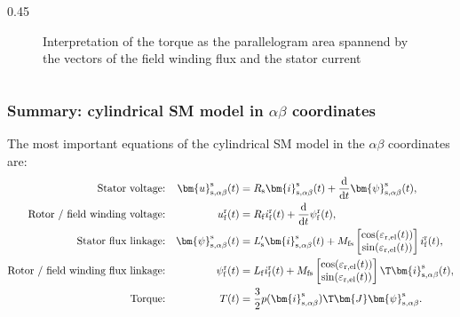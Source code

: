 \begin{frame}
\begin{columns}
\begin{column}{0.45\textwidth}
\begin{figure}
                \caption{Interpretation of the torque as the parallelogram area spannend by the vectors of the field winding flux and the stator current}
                \label{fig:Torque_interpretation}
            \end{figure}
        \end{column}
    \end{columns}
\end{frame}

\begin{frame}
	\frametitle{Summary: cylindrical SM model in $\alpha\beta$ coordinates}
    The most important equations of the cylindrical SM model in the  $\alpha\beta$ coordinates are:
    \begin{equation*}
        \begin{alignedat}{4}
            &&\mbox{Stator voltage:}&& \quad\bm{u}^\mathrm{s}_\mathrm{s,\alpha\beta}(&t) &&= R_\mathrm{s} \bm{i}^\mathrm{s}_\mathrm{s,\alpha\beta}(t)+ \frac{\mathrm{d}}{\mathrm{d}t}\bm{\psi}^\mathrm{s}_\mathrm{s,\alpha\beta}(t),\\
            &&\mbox{Rotor / field winding voltage:}&& \quad u^\mathrm{r}_\mathrm{f}(&t) &&= R_\mathrm{f}i^\mathrm{r}_\mathrm{f}(t)+\frac{\mathrm{d}}{\mathrm{d}t}\psi^\mathrm{r}_\mathrm{f}(t),\\
            &&\mbox{Stator flux linkage:}&& \quad \bm{\psi}^\mathrm{s}_\mathrm{s,\alpha\beta}(&t) &&= L'_\mathrm{s} \bm{i}^\mathrm{s}_{\mathrm{s},\alpha\beta}(t) + M_\mathrm{fs} \begin{bmatrix}\cos(\varepsilon_\mathrm{r,el}(t))\\ \sin(\varepsilon_\mathrm{r,el}(t))\end{bmatrix} i^\mathrm{r}_{\mathrm{f}}(t),\\
            &&\mbox{Rotor / field winding flux linkage:}&& \psi^\mathrm{r}_\mathrm{f}(&t) &&= L_\mathrm{f} i^\mathrm{r}_\mathrm{f}(t) + M_\mathrm{fs} \begin{bmatrix}\cos(\varepsilon_\mathrm{r,el}(t)) \\ \sin(\varepsilon_\mathrm{r,el}(t))\end{bmatrix}\T\bm{i}^\mathrm{s}_\mathrm{s,\alpha\beta}(t),\\
            &&\mbox{Torque:}&& \quad T(&t) &&= \frac{3}{2} p (\bm{i}_\mathrm{s,\alpha\beta}^\mathrm{s})\T\bm{J}\bm{\psi}_\mathrm{s,\alpha\beta}^\mathrm{s}. 
        \end{alignedat}
    \end{equation*}
\end{frame}


